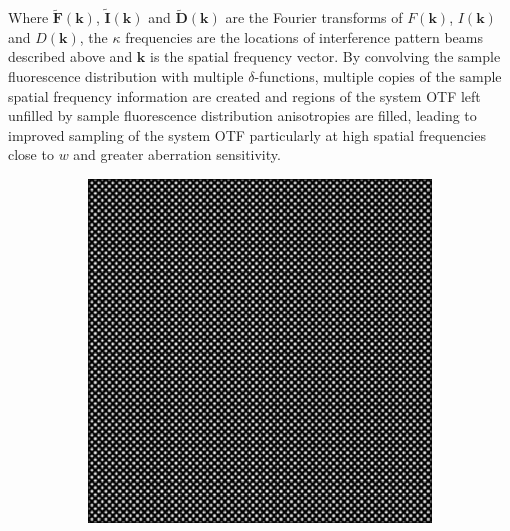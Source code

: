 Where $\tilde{\textbf{F}}(\textbf{k})$, $\tilde{\textbf{I}}(\textbf{k})$ and 
$\tilde{\textbf{D}}(\textbf{k})$ are the Fourier transforms of $F(\textbf{k})$, 
$I(\textbf{k})$ and $D(\textbf{k})$, the $\kappa$ frequencies are the 
locations of interference pattern beams described above and $\textbf{k}$ is 
the spatial frequency vector. By convolving the sample fluorescence 
distribution with  multiple $\delta$-functions, multiple copies of the 
sample spatial frequency information are created and regions of the 
system OTF left  unfilled by sample fluorescence distribution anisotropies 
are filled, leading to  improved sampling of the system OTF particularly 
at high spatial frequencies close to $w$ and greater aberration 
sensitivity\cite{vzurauskas2019isosense}.

\begin{figure}[h]
	\centering
	\begin{subfigure}{0.4\textwidth}
		\centering
		\includegraphics[width=1\linewidth, scale=0.5]{./images/isosense_visualisation_real.png}
		\caption{}
		\label{fig:isosense_visualisation_real}
	\end{subfigure}
	\begin{subfigure}{0.4\textwidth}
		\centering

\end{subfigure}
\end{figure}
